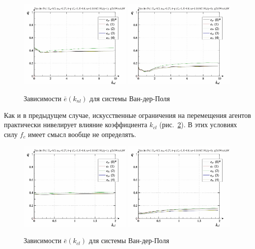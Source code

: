 \begin{figure}[ht!]
\begin{center}
  \includegraphics[width=0.49\textwidth]{p/cha/vdp/vdp_id-p_k_nl_sign.png}
  \hfill
  \includegraphics[width=0.49\textwidth]{p/cha/vdp/vdp_id-p_k_nl_sin.png}
\end{center}
  \caption{Зависимости $\bar{e}(k_{nl})$ для системы Ван-дер-Поля}
\label{atu:f:vdp_e_k_nl}
\end{figure}

Как и в предыдущем случае,
искусственные ограничения на перемещения агентов
практически нивелирует влияние коэффициента $k_{cl}$ (рис.~\ref{atu:f:vdp_e_k_cl}).
В этих условиях силу $f_c$ имеет смысл вообще не определять.

\begin{figure}[ht!]
\begin{center}
  \includegraphics[width=0.49\textwidth]{p/cha/vdp/vdp_id-p_k_cl_sign.png}
  \hfill
  \includegraphics[width=0.49\textwidth]{p/cha/vdp/vdp_id-p_k_cl_sin.png}
\end{center}
  \caption{Зависимости $\bar{e}(k_{cl})$ для системы Ван-дер-Поля}
\label{atu:f:vdp_e_k_cl}
\end{figure}

